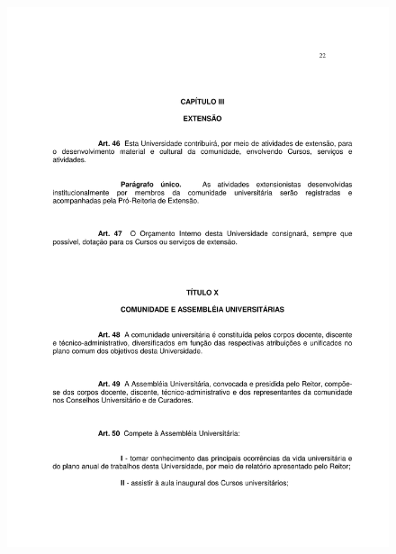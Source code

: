 \begin{figure}[p]
	\centering 
	\includegraphics[scale=0.7]{capitulos/resolucoes/cuni414/cuni414-22.pdf}
\end{figure} \pagebreak

